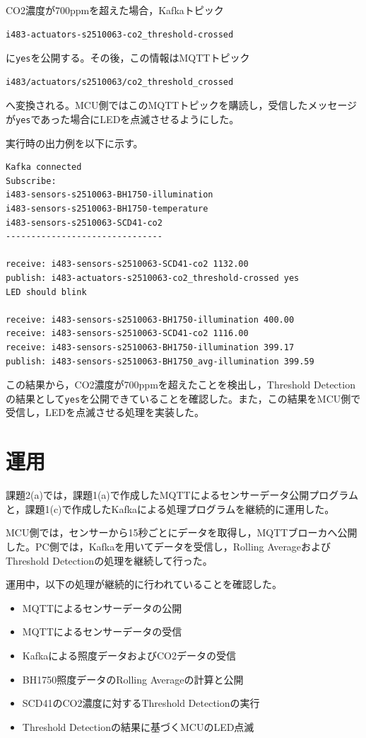 \documentclass[a4paper,11pt,lualatex,ja=standard]{bxjsarticle}
\begin{document}
CO2濃度が700ppmを超えた場合，Kafkaトピック

\begin{verbatim}
i483-actuators-s2510063-co2_threshold-crossed
\end{verbatim}

に\texttt{yes}を公開する。その後，この情報はMQTTトピック

\begin{verbatim}
i483/actuators/s2510063/co2_threshold_crossed
\end{verbatim}

へ変換される。MCU側ではこのMQTTトピックを購読し，受信したメッセージが\texttt{yes}であった場合にLEDを点滅させるようにした。

実行時の出力例を以下に示す。

\begin{verbatim}
Kafka connected
Subscribe:
i483-sensors-s2510063-BH1750-illumination
i483-sensors-s2510063-BH1750-temperature
i483-sensors-s2510063-SCD41-co2
-------------------------------

receive: i483-sensors-s2510063-SCD41-co2 1132.00
publish: i483-actuators-s2510063-co2_threshold-crossed yes
LED should blink

receive: i483-sensors-s2510063-BH1750-illumination 400.00
receive: i483-sensors-s2510063-SCD41-co2 1116.00
receive: i483-sensors-s2510063-BH1750-illumination 399.17
publish: i483-sensors-s2510063-BH1750_avg-illumination 399.59
\end{verbatim}

この結果から，CO2濃度が700ppmを超えたことを検出し，Threshold Detectionの結果として\texttt{yes}を公開できていることを確認した。また，この結果をMCU側で受信し，LEDを点滅させる処理を実装した。

\section{運用}

課題2(a)では，課題1(a)で作成したMQTTによるセンサーデータ公開プログラムと，課題1(c)で作成したKafkaによる処理プログラムを継続的に運用した。

MCU側では，センサーから15秒ごとにデータを取得し，MQTTブローカへ公開した。PC側では，Kafkaを用いてデータを受信し，Rolling AverageおよびThreshold Detectionの処理を継続して行った。

運用中，以下の処理が継続的に行われていることを確認した。

\begin{itemize}
\item MQTTによるセンサーデータの公開
\item MQTTによるセンサーデータの受信
\item Kafkaによる照度データおよびCO2データの受信
\item BH1750照度データのRolling Averageの計算と公開
\item SCD41のCO2濃度に対するThreshold Detectionの実行
\item Threshold Detectionの結果に基づくMCUのLED点滅
\end{itemize}
\end{document}

